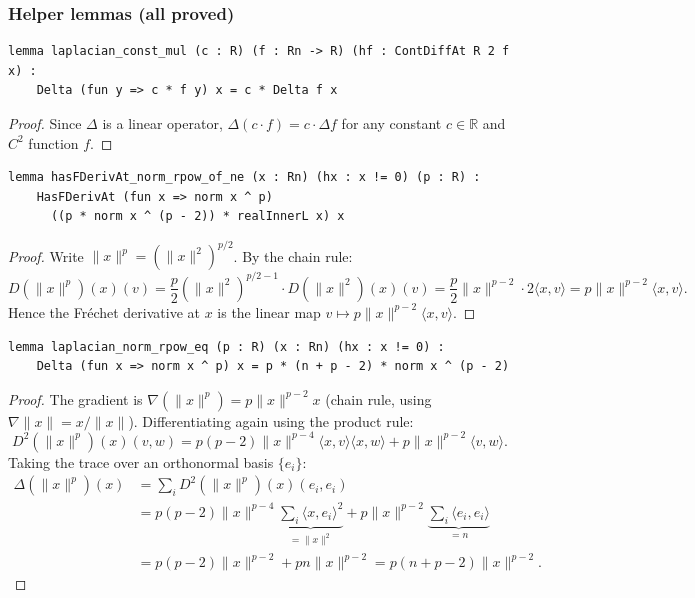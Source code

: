 ﻿\documentclass[12pt, a4paper]{article}
\renewcommand{\_}{\origunderscore\allowbreak}
\theoremstyle{definition}
\theoremstyle{plain}
\begin{document}
\subsubsection{Helper lemmas (all proved)}

\begin{lstlisting}[caption={Scalar linearity of Laplacian (proved)}]
lemma laplacian_const_mul (c : R) (f : Rn -> R) (hf : ContDiffAt R 2 f x) :
    Delta (fun y => c * f y) x = c * Delta f x
\end{lstlisting}

\begin{proof}
Since $\Delta$ is a linear operator, $\Delta(c \cdot f) = c \cdot \Delta f$
for any constant $c \in \mathbb{R}$ and $C^2$ function $f$.
\end{proof}

\begin{lstlisting}[caption={First derivative of radial power (proved)}]
lemma hasFDerivAt_norm_rpow_of_ne (x : Rn) (hx : x != 0) (p : R) :
    HasFDerivAt (fun x => norm x ^ p)
      ((p * norm x ^ (p - 2)) * realInnerL x) x
\end{lstlisting}

\begin{proof}
Write $\|x\|^p = (\|x\|^2)^{p/2}$. By the chain rule:
\[
  D(\|x\|^p)(x)(v) = \frac{p}{2}(\|x\|^2)^{p/2 - 1} \cdot D(\|x\|^2)(x)(v)
  = \frac{p}{2}\|x\|^{p-2} \cdot 2\langle x, v\rangle = p\|x\|^{p-2}\langle x, v\rangle.
\]
Hence the Fréchet derivative at $x$ is the linear map $v \mapsto p\|x\|^{p-2}\langle x, v\rangle$.
\end{proof}

\begin{lstlisting}[caption={Laplacian of radial power (proved)}]
lemma laplacian_norm_rpow_eq (p : R) (x : Rn) (hx : x != 0) :
    Delta (fun x => norm x ^ p) x = p * (n + p - 2) * norm x ^ (p - 2)
\end{lstlisting}

\begin{proof}
The gradient is $\nabla(\|x\|^p) = p\|x\|^{p-2}x$ (chain rule, using
$\nabla\|x\| = x/\|x\|$).
Differentiating again using the product rule:
\[
  D^2(\|x\|^p)(x)(v,w) = p(p-2)\|x\|^{p-4}\langle x,v\rangle\langle x,w\rangle
  + p\|x\|^{p-2}\langle v,w\rangle.
\]
Taking the trace over an orthonormal basis $\{e_i\}$:
\begin{align*}
  \Delta(\|x\|^p)(x)
  &= \sum_i D^2(\|x\|^p)(x)(e_i, e_i) \\
  &= p(p-2)\|x\|^{p-4}\underbrace{\sum_i\langle x,e_i\rangle^2}_{=\|x\|^2}
   + p\|x\|^{p-2}\underbrace{\sum_i\langle e_i,e_i\rangle}_{=n} \\
  &= p(p-2)\|x\|^{p-2} + pn\|x\|^{p-2} = p(n+p-2)\|x\|^{p-2}.
\end{align*}
\end{proof}
\end{document}
